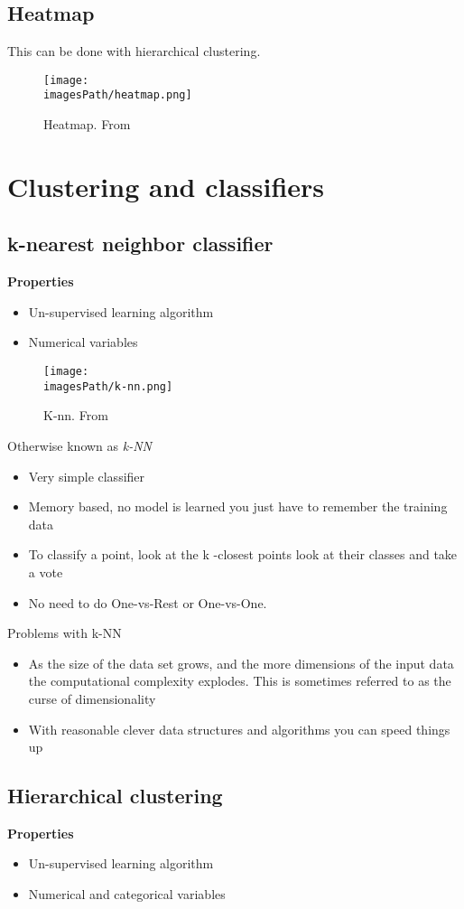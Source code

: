 \begin{multicols}{2}
\subsection{Heatmap}
This can be done with hierarchical clustering.
\begin{figure}[H]
    \centering
    \texttt{[image: \\imagesPath/heatmap.png]}
    \caption{Heatmap. From \cite{iml}}
\end{figure}


\section{Clustering and classifiers}
\subsection{k-nearest neighbor classifier}
\textbf{Properties}
\begin{itemize}
    \item Un-supervised learning algorithm
    \item Numerical variables 
\end{itemize}
\begin{figure}[H]
    \centering
    \texttt{[image: \\imagesPath/k-nn.png]}
    \caption{K-nn. From \cite{iml}}
\end{figure}


Otherwise known as \textit{k-NN}
\begin{itemize}
    \item Very simple classifier
    \item Memory based, no model is learned you just have to remember the
training data
    \item To classify a point, look at the k -closest points look at their classes
and take a vote
    \item No need to do One-vs-Rest or One-vs-One.
\end{itemize}

Problems with k-NN
\begin{itemize}
    \item As the size of the data set grows, and the more dimensions of the
    input data the computational complexity explodes. This is sometimes
    referred to as the curse of dimensionality
    \item With reasonable clever data structures and algorithms you can speed
things up
\end{itemize}


\subsection{Hierarchical clustering}
\textbf{Properties}
\begin{itemize}
    \item Un-supervised learning algorithm
    \item Numerical and categorical variables 
\end{itemize}


\end{multicols}

